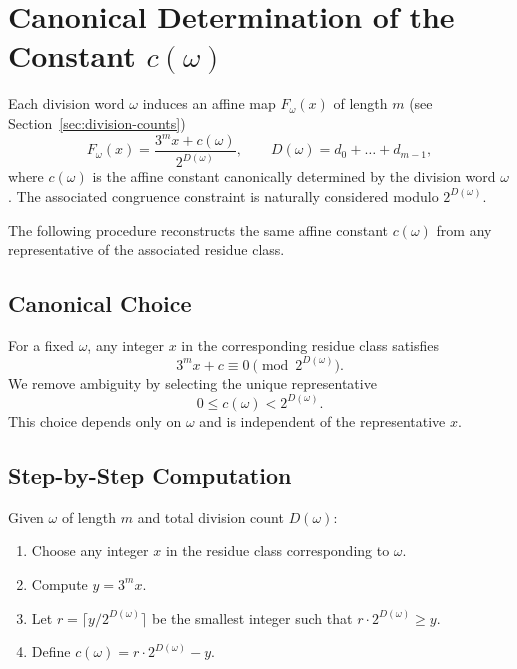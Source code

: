 \documentclass[12pt, oneside]{article}
\numberwithin{equation}{section}
\theoremstyle{definition}
\theoremstyle{plain}
\theoremstyle{remark}
\begin{document}
\appendix

\newpage
\section{Canonical Determination of the Constant \(c(\omega)\)}
\label{app:canonical-c}

Each division word \(\omega\) induces an affine map \(F_\omega(x)\) of length $m$
(see Section~\ref{sec:division-counts})
\[
F_\omega(x) = \frac{3^m x + c(\omega)}{2^{D(\omega)}}, \qquad D(\omega) = d_0 + \dots + d_{m-1},
\]
where \(c(\omega)\) is the affine constant canonically determined by the
division word \(\omega\).  The associated congruence constraint is naturally
considered modulo \(2^{D(\omega)}\).

The following procedure reconstructs the same affine constant \(c(\omega)\)
from any representative of the associated residue class.

\subsection{Canonical Choice}

For a fixed \(\omega\), any integer \(x\) in the corresponding residue class satisfies
\[
3^m x + c \equiv 0 \pmod{2^{D(\omega)}}.
\]
We remove ambiguity by selecting the unique representative
\[
0 \le c(\omega) < 2^{D(\omega)}.
\]
This choice depends only on \(\omega\) and is independent of the representative \(x\).

\subsection{Step-by-Step Computation}

Given \(\omega\) of length \(m\) and total division count \(D(\omega)\):

\begin{enumerate}
\item Choose any integer \(x\) in the residue class corresponding to \(\omega\).  
\item Compute \(y = 3^m x\).  
\item Let \(r = \lceil y / 2^{D(\omega)} \rceil\) be the smallest integer such that \(r \cdot 2^{D(\omega)} \ge y\).  
\item Define \(c(\omega) = r \cdot 2^{D(\omega)} - y\).  
\end{enumerate}
\end{document}
